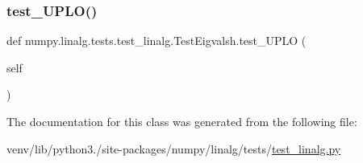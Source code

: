 \subsubsection{\texorpdfstring{test\+\_\+\+U\+P\+L\+O()}{test\_UPLO()}}
{\footnotesize\ttfamily def numpy.\+linalg.\+tests.\+test\+\_\+linalg.\+Test\+Eigvalsh.\+test\+\_\+\+U\+P\+LO (\begin{DoxyParamCaption}\item[{}]{self }\end{DoxyParamCaption})}



The documentation for this class was generated from the following file\+:\begin{DoxyCompactItemize}
\item 
venv/lib/python3./site-\/packages/numpy/linalg/tests/\hyperlink{test__linalg_8py}{test\+\_\+linalg.\+py}\end{DoxyCompactItemize}
